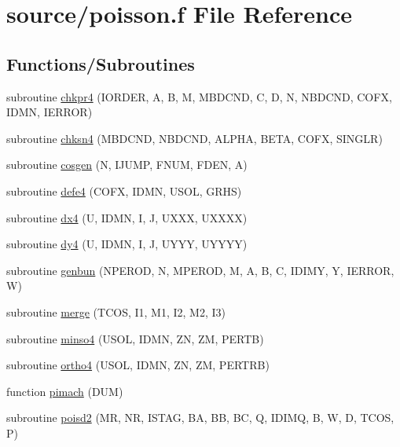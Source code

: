 \hypertarget{poisson_8f}{}\section{source/poisson.f File Reference}
\label{poisson_8f}
\subsection*{Functions/\+Subroutines}
\begin{DoxyCompactItemize}
\item 
subroutine \hyperlink{poisson_8f_a82f42c45b2e6677f11e94429b26e1663}{chkpr4} (I\+O\+R\+D\+E\+R, A, B, M, M\+B\+D\+C\+N\+D, C, D, N, N\+B\+D\+C\+N\+D, C\+O\+F\+X, I\+D\+M\+N, I\+E\+R\+R\+O\+R)
\item 
subroutine \hyperlink{poisson_8f_a2ddc05f3ab4714b20a9d185411ae1ac8}{chksn4} (M\+B\+D\+C\+N\+D, N\+B\+D\+C\+N\+D, A\+L\+P\+H\+A, B\+E\+T\+A, C\+O\+F\+X, S\+I\+N\+G\+L\+R)
\item 
subroutine \hyperlink{poisson_8f_aef77c4415ca0759b213e0c9f88223ab3}{cosgen} (N, I\+J\+U\+M\+P, F\+N\+U\+M, F\+D\+E\+N, A)
\item 
subroutine \hyperlink{poisson_8f_a355d5a5f4d4f6d5d3949cb08dce619ef}{defe4} (C\+O\+F\+X, I\+D\+M\+N, U\+S\+O\+L, G\+R\+H\+S)
\item 
subroutine \hyperlink{poisson_8f_a83808063c1fdd679d4b026ba63bd926d}{dx4} (U, I\+D\+M\+N, I, J, U\+X\+X\+X, U\+X\+X\+X\+X)
\item 
subroutine \hyperlink{poisson_8f_a61a13ff9c3d8b209f2d82002f7d95620}{dy4} (U, I\+D\+M\+N, I, J, U\+Y\+Y\+Y, U\+Y\+Y\+Y\+Y)
\item 
subroutine \hyperlink{poisson_8f_ad1505c36f22eafeef816abf4e9e81554}{genbun} (N\+P\+E\+R\+O\+D, N, M\+P\+E\+R\+O\+D, M, A, B, C, I\+D\+I\+M\+Y, Y, I\+E\+R\+R\+O\+R, W)
\item 
subroutine \hyperlink{poisson_8f_a231b7bb127bbc680c262deff2cfb3aee}{merge} (T\+C\+O\+S, I1, M1, I2, M2, I3)
\item 
subroutine \hyperlink{poisson_8f_a691b584433e3b4a9f083c04664d38ce7}{minso4} (U\+S\+O\+L, I\+D\+M\+N, Z\+N, Z\+M, P\+E\+R\+T\+B)
\item 
subroutine \hyperlink{poisson_8f_a1ac1a469b1d6fa84bbdc9a8743706153}{ortho4} (U\+S\+O\+L, I\+D\+M\+N, Z\+N, Z\+M, P\+E\+R\+T\+R\+B)
\item 
function \hyperlink{poisson_8f_a0eba8f880947ac3a6a76d9f0b5006fa5}{pimach} (D\+U\+M)
\item 
subroutine \hyperlink{poisson_8f_a0764fedadc183c9ff523c436a98a570c}{poisd2} (M\+R, N\+R, I\+S\+T\+A\+G, B\+A, B\+B, B\+C, Q, I\+D\+I\+M\+Q, B, W, D, T\+C\+O\+S, P)

\end{DoxyCompactItemize}
